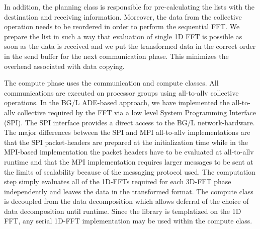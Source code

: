 In addition, the planning class is responsible for pre-calculating the
lists with the destination and receiving information. Moreover, the
data from the collective operation needs to be reordered in order to
perform the sequential FFT.  We prepare the list in such a way that
evaluation of single 1D FFT is possible as soon as the data is received and we
put the transformed data in the correct order in the send buffer for
the next communication phase. This minimizes the overhead associated
with data copying.

The compute phase uses the communication and compute classes.
All communications are executed on processor groups using
all-to-allv collective operations.  In the BG/L ADE-based approach, we
have implemented the all-to-allv collective required by the FFT via a
low level System Programming Interface (SPI). The SPI interface
provides a direct access to the BG/L network-hardware. The major
differences between the SPI and MPI all-to-allv implementations are that
the SPI packet-headers are prepared at the initialization time while in
the MPI-based implementation the packet headers have to be evaluated
at all-to-allv runtime and that the MPI implementation requires larger
messages to be sent at the limits of scalability because of the
messaging protocol used.  The computation step simply evaluates all
of the 1D-FFTs required for each 3D-FFT phase independently and
leaves the data in the transformed format.
The compute class is decoupled from the data decomposition which
allows deferral of the choice of data decomposition until runtime. Since
the library is templatized on the 1D FFT, any serial 1D-FFT implementation 
may be used within the compute class.

 
